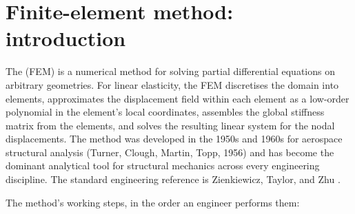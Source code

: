 \section{Finite-element method: introduction}

The  (FEM) is a numerical method
for solving partial differential equations on arbitrary geometries.
For linear elasticity, the FEM discretises the domain into
elements, approximates the displacement field within each element
as a low-order polynomial in the element's local coordinates,
assembles the global stiffness matrix from the elements, and
solves the resulting linear system for the nodal displacements.
The method was developed in the 1950s and 1960s for aerospace
structural analysis (Turner, Clough, Martin, Topp, 1956) and has
become the dominant analytical tool for structural mechanics
across every engineering discipline. The standard engineering
reference is Zienkiewicz, Taylor, and Zhu
\cite[chs.~1--3]{text:zienkiewicz-fem}.

The method's working steps, in the order an engineer performs
them:

